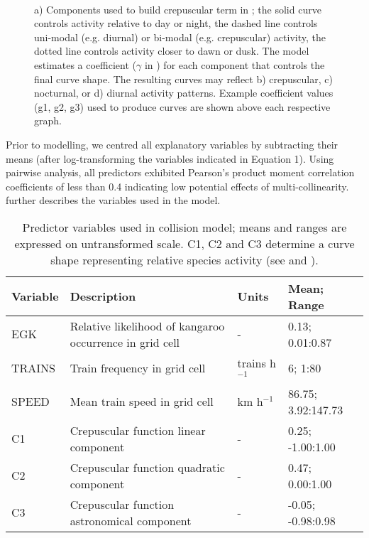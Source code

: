 \begin{figure*}[htp]
  \captionsetup[subfloat]{farskip=-2pt,nearskip=-2pt}
  \centering
  \\
  \caption[]{a) Components used to build crepuscular term in ; the solid curve controls activity relative to day or night, the dashed line controls uni-modal (e.g. diurnal) or bi-modal (e.g. crepuscular) activity, the dotted line controls activity closer to dawn or dusk. The model estimates a coefficient ($\gamma$ in ) for each component that controls the final curve shape. The resulting curves may reflect b) crepuscular, c) nocturnal, or d) diurnal activity patterns. Example coefficient values (g1, g2, g3) used to produce curves are shown above each respective graph.}
  \label{train_crep}
\end{figure*}

Prior to modelling, we centred all explanatory variables by subtracting their means (after log-transforming the variables indicated in Equation 1). Using pairwise analysis, all predictors exhibited Pearson's product moment correlation coefficients of less than 0.4 indicating low potential effects of multi-collinearity.   further describes the variables used in the model.

\begin{table}[htp]
\caption{Predictor variables used in collision model; means and ranges are expressed on untransformed scale.  C1, C2 and C3 determine a curve shape representing relative species activity (see  and ).}
\begin{tabularx}{\textwidth}{llll} \toprule
Variable	&Description												&Units				&Mean; Range \\ \midrule 
EGK			&Relative likelihood of kangaroo occurrence in grid cell	&-					&0.13; 0.01:0.87 \\ 
TRAINS		&Train frequency in grid cell								&trains h$^{-1}$	&6; 1:80 \\ 
SPEED		&Mean train speed in grid cell								&km h$^{-1}$		&86.75; 3.92:147.73 \\ 
C1			&Crepuscular function linear component						&- 					&0.25; -1.00:1.00 \\
C2			&Crepuscular function quadratic component					&-					&0.47; 0.00:1.00 \\
C3			&Crepuscular function astronomical component				&-					&-0.05; -0.98:0.98 \\
\bottomrule
\end{tabularx}
\label{train_predictors}
\end{table}

